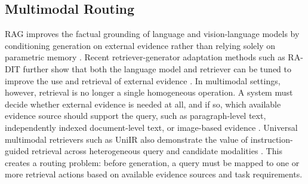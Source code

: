 \documentclass[a4paper,fleqn]{cas-dc}
\begin{document}
\subsection{Multimodal Routing}
\label{subsec:multimodal-routing}
RAG improves the factual grounding of language and vision-language models by conditioning generation on external evidence rather than relying solely on parametric memory \citep{Lewis2020RAG,Karpukhin2020Dense,Izacard2021Leveraging,Gao2023Citations}. 
Recent retriever-generator adaptation methods such as RA-DIT further show that both the language model and retriever can be tuned to improve the use and retrieval of external evidence \citep{Lin2024RADIT}.
In multimodal settings, however, retrieval is no longer a single homogeneous operation. 
A system must decide whether external evidence is needed at all, and if so, which available evidence source should support the query, such as paragraph-level text, independently indexed document-level text, or image-based evidence \citep{Chang2022WebQA,Marino2019OKVQA,Yeo2026UniversalRAG}. 
Universal multimodal retrievers such as UniIR also demonstrate the value of instruction-guided retrieval across heterogeneous query and candidate modalities \citep{Wei2024UniIR}.
This creates a routing problem: before generation, a query must be mapped to one or more retrieval actions based on available evidence sources and task requirements.
\end{document}
